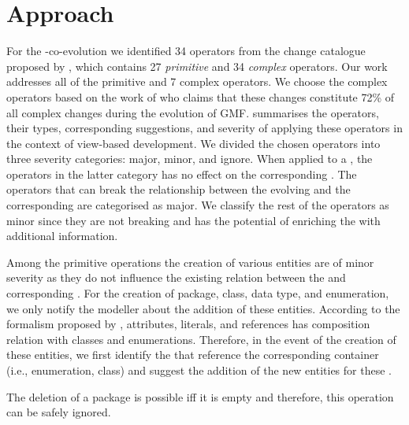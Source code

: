 \section{Approach} \label{sec:Approach}
For the \metamodel-\viewtype co-evolution we identified 34 operators from the change catalogue proposed by \cite{herrmannsdoerfer_extensive_2011}, which contains 27 \textit{primitive} and 34 \textit{complex} operators. Our work addresses all of the primitive and 7 complex operators. We choose the complex operators based on the work of \cite{khelladi_detecting_2015} who claims that these changes constitute 72\% of all complex changes during the evolution of GMF.  summarises the operators, their types, corresponding suggestions, and severity of applying these operators in the context of view-based development. We divided the chosen operators into three severity categories: major, minor, and ignore. When applied to a \metamodel, the operators in the latter category has no effect on the corresponding \viewtypes. The operators that can break the relationship between the evolving \metamodel and the corresponding \viewtypes are categorised as major. We classify the rest of the operators as minor since they are not breaking and has the potential of enriching the \viewtypes with additional information.

Among the primitive operations the creation of various entities are of minor severity as they do not influence the existing relation between the \metamodel and corresponding \viewtypes. For the creation of package, class, data type, and enumeration, we only notify the modeller about the addition of these entities. According to the \metamodeling formalism proposed by \cite{herrmannsdoerfer_extensive_2011}, attributes, literals, and references has composition relation with classes and enumerations. Therefore, in the event of the creation of these entities, we first identify the \viewtypes that reference the corresponding container (i.e., enumeration, class) and suggest the addition of the new entities for these \viewtypes.

The deletion of a package is possible iff it is empty and therefore, this operation can be safely ignored. 

